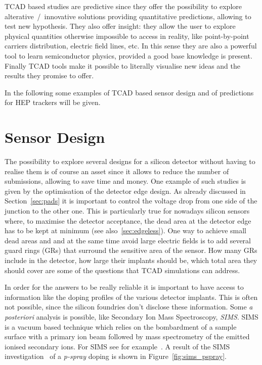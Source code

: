 TCAD based studies are predictive since they offer the possibility to explore alterative~/~innovative 
solutions providing quantitative predictions, allowing to test new hypothesis. 
They also offer insight: they allow the user to explore physical quantities otherwise impossible to 
access in reality, like point-by-point carriers distribution, electric field lines, etc. In this sense they 
are also a powerful tool to learn semiconductor physics, provided a good base knowledge is present.
Finally TCAD tools make it possible to literally visualise new ideas and the results they promise to 
offer.

In the following some examples of TCAD based sensor design and of predictions for HEP
trackers will be given.

\section{Sensor Design}
\label{sec:sensordesign}

The possibility to explore several designs for a silicon detector without having to realise them is 
of course an asset since it allows to reduce the number of submissions, allowing to save time 
and money. 
One example of such studies is given by the optimisation of the detector edge design. 
As already discussed in Section~\ref{sec:pads} it is important to control the voltage 
drop from one side of the junction to the other one. This is particularly true for nowadays 
silicon sensors where, to maximise the detector acceptance, the dead area at the 
detector edge has to be kept at minimum (see also~\ref{sec:edgeless}). One way to achieve 
small dead areas and and at the same time avoid large electric fields is to add several 
guard rings (GRs) that surround the sensitive area of the sensor. How many GRs include in 
the detector, how large their implants should be, which total area they should cover are 
some of the questions that TCAD simulations can address. 

In order for the answers to be really reliable it is important to have access to information 
like the doping profiles of the various detector implants. This is often not possible, since 
the silicon foundries don't disclose these information. Some {\it a posteriori} analysis is possible, 
like Secondary Ion Mass Spectroscopy, {\it SIMS}. SIMS is a vacuum based technique 
which relies on the bombardment of a sample surface with a primary ion 
beam  followed  by  mass  spectrometry  of  the 
 emitted  ionised  secondary  ions.  For SIMS see for example~\cite{dinu:tel-00872318}.
A result of the SIMS investigation~\cite{SIMS} of a {\it p-spray} doping is shown in Figure~\ref{fig:sims_pspray}. 

